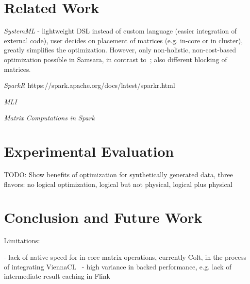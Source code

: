 \documentclass{article}
\begin{document}
\section{Related Work}

{\em SystemML} \cite{Ghoting2011} - lightweight DSL instead of custom language (easier integration of external code), user decides on placement of matrices (e.g. in-core or in cluster), greatly simplifies the optimization. However, only non-holistic, non-cost-based optimization possible in Samsara, in contrast to~\cite{Boehm2014}; also different blocking of matrices.

{\em SparkR} https://spark.apache.org/docs/latest/sparkr.html

{\em MLI} \cite{Sparks2013}

{\em Matrix Computations in Spark} \cite{Zadeh2016}

\section{Experimental Evaluation}\label{sec:experiments}

TODO: Show benefits of optimization for synthetically generated data, three flavors: no logical optimization, logical but not physical, logical plus physical

\section{Conclusion and Future Work}

Limitations:

 - lack of native speed for in-core matrix operations, currently Colt, in the process of integrating ViennaCL~\cite{Tillet2013}
 - high variance in backed performance, e.g. lack of intermediate result caching in Flink



\end{document}
